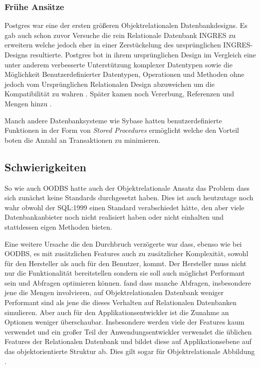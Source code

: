 \subsubsection{Frühe Ansätze}
Postgres war eine der ersten größeren Objektrelationalen Datenbankdesigns. Es gab auch schon zuvor Versuche die rein Relationale Datenbank INGRES zu erweitern welche jedoch eher in einer Zerstückelung des ursprünglichen INGRES-Designs resultierte. Postgres bot in ihrem ursprünglichen Design im Vergleich eine unter anderem verbesserte Unterstützung komplexer Datentypen sowie die Möglichkeit Benutzerdefinierter Datentypen, Operationen und Methoden ohne jedoch vom Ursprünglichen Relationalen Design abzuweichen um die Kompatibilität zu wahren \cite{stonebraker1986}. Später kamen noch Vererbung, Referenzen und Mengen hinzu \cite{stonebraker1990}. 

Manch andere Datenbanksysteme wie Sybase hatten benutzerdefinierte Funktionen in der Form von \emph{Stored Procedures} ermöglicht welche den Vorteil boten die Anzahl an Transaktionen zu minimieren.

\subsection{Schwierigkeiten}
So wie auch OODBS hatte auch der Objektrelationale Ansatz das Problem dass sich zunächst keine Standards durchgesetzt haben. Dies ist auch heutzutage noch wahr obwohl der SQL:1999 einen Standard verabschiedet hätte, den aber viele Datenbankanbieter noch nicht realisiert haben oder nicht einhalten und stattdessen eigen Methoden bieten.

Eine weitere Ursache die den Durchbruch verzögerte war dass, ebenso wie bei OODBS, es mit zusätzlichen Features auch zu zusätzlicher Komplexität, sowohl für den Hersteller als auch für den Benutzer, kommt. Der Hersteller muss nicht nur die Funktionalität bereitstellen sondern sie soll auch möglichst Performant sein und Abfragen optimieren können. \cite{carey1997} fand dass manche Abfragen, insbesondere jene die Mengen involvieren, auf Objektrelationalen Datenbank weniger Performant sind als jene die dieses Verhalten auf Relationalen Datenbanken simulieren.
Aber auch für den Applikationsentwickler ist die Zunahme an Optionen weniger überschaubar. Insbesondere werden viele der Features kaum verwendet und ein großer Teil der Anwendungsentwickler verwendet die üblichen Features der Relationalen Datenbank und bildet diese auf Applikationsebene auf das objektorientierte Struktur ab. Dies gilt sogar für Objektrelationale Abbildung \cite{fotache2009}.

